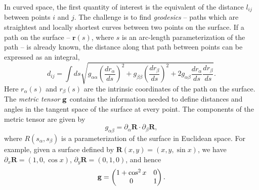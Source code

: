 \documentclass[preprint,12pt]{elsarticle}
\newcommand{\tens}[1]{\text{\textbf{#1}}}
\newcommand{\bs}[1]{\boldsymbol{#1}}
\begin{document}
In curved space, the first quantity of interest is the equivalent of the distance $l_{ij}$ between points $i$ and $j$. The challenge is to find \emph{geodesics} -- paths which are straightest and locally shortest curves between two points on the surface. If a path on the surface -- $\textbf{r}(s)$, where $s$ is an arc-length parameterization of the path -- is already known, the distance along that path between points can be expressed as an integral,
\begin{equation}\label{eq:distance}
d_{ij} = \int ds\sqrt{g_{\alpha\alpha} \left(\frac{dr_\alpha}{ds}\right)^2 + g_{\beta\beta}\left(\frac{dr_\beta}{ds}\right)^2 + 2g_{\alpha\beta}\frac{dr_\alpha}{ds}\frac{dr_\beta}{ds}}.
\end{equation}
Here  $r_\alpha(s)$ and $r_\beta(s)$ are the intrinsic coordinates of the path on the surface. The \emph{metric tensor} $\tens{g}$ contains the information needed to define distances and angles in the tangent space of the surface at every point. The components of the metric tensor are given by 
\begin{equation}
    g_{\alpha\beta} = \partial_\alpha \bs{R} \cdot \partial_\beta \bs{R},
\end{equation} 
where $R(s_\alpha,s_\beta)$ is a parameterization of the surface in Euclidean space. For example, given a surface defined by $\bs{R}(x,y) = (x,y,\sin{x})$, we have $\partial_x \bs{R} = (1,0,\cos{x})$, $\partial_y \bs{R} = (0,1,0)$, and  hence 
\begin{equation}
    \tens{g} = \left(\begin{matrix}
        1+\cos^2{x} & 0 \\ 
        0 & 1
    \end{matrix}\right). 
\end{equation}
\end{document}
